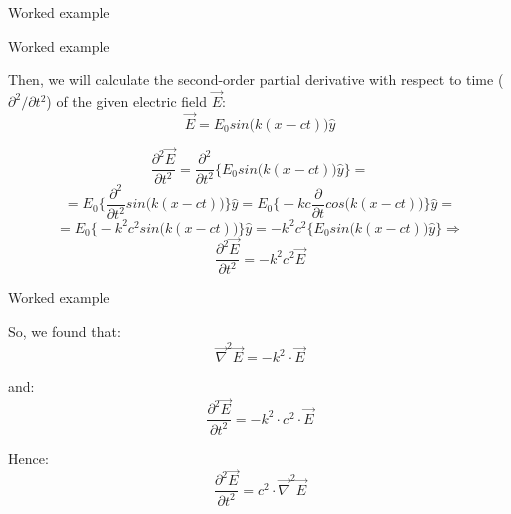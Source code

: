 {\begin{frame}{Worked example}
\end{frame}

%
%
%
%

\begin{frame}{Worked example}

Then, we will calculate the second-order partial derivative with respect to time
($\partial^2 / \partial t^2$) of the given electric field $\vec{E}$:
\begin{equation*}
  \vec{E} = E_{0} sin\Big(k(x-ct)\Big) \hat{y}
\end{equation*}

\begin{equation*}
  \frac{\partial^{2} \vec{E}} {\partial t^{2}} =
  \frac{\partial^{2}} {\partial t^{2}} \bigg\{ E_{0} sin\Big(k(x-ct)\Big) \hat{y} \bigg\} =
\end{equation*}
\begin{equation*}
  = E_{0} \bigg\{ \frac{\partial^{2}} {\partial t^{2}} sin\Big(k(x-ct)\Big) \bigg\} \hat{y} =
     E_{0} \bigg\{-kc \frac{\partial} {\partial t} cos\Big(k(x-ct)\Big) \bigg\} \hat{y} =
\end{equation*}
\begin{equation*}
   = E_{0} \bigg\{ - k^{2} c^{2} sin\Big(k(x-ct)\Big) \bigg\} \hat{y} =
    - k^{2} c^{2} \bigg\{ E_{0} sin\Big(k(x-ct)\Big) \hat{y} \bigg\} \Rightarrow
\end{equation*}
\begin{equation*}
  \frac{\partial^{2} \vec{E}} {\partial t^{2}} = - k^2 c^2 \vec{E}
\end{equation*}

\end{frame}


%
%
%
%

\begin{frame}{Worked example}

So, we found that:
\begin{equation*}
  \vec{\nabla}^{2} \vec{E} = - k^2 \cdot \vec{E}
\end{equation*}

and:
\begin{equation*}
  \frac{\partial^{2} \vec{E}} {\partial t^{2}} = - k^2 \cdot c^2 \cdot \vec{E}
\end{equation*}

Hence:
\begin{equation*}
  \frac{\partial^{2} \vec{E}} {\partial t^{2}} = c^2 \cdot \vec{\nabla}^{2} \vec{E}
\end{equation*}


\end{frame}}
